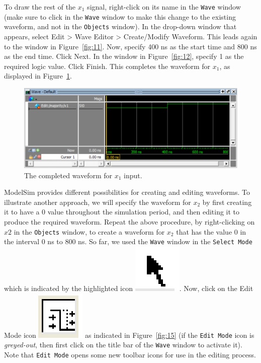 \documentclass[11pt, twoside, pdftex]{article}
\begin{document}
To draw the rest of the $x_1$ signal, right-click on its name in the \texttt{Wave} window (make
sure to click in the \texttt{Wave} window to make this 
change to the existing waveform, and not in the \texttt{Objects} window).
In the drop-down window that appears, select {\sf Edit > Wave Editor > Create/Modify Waveform}.
This leads again to the window in Figure~\ref{fig:11}. Now, specify 400 ns as the start time
and 800 ns as the end time. Click {\sf Next}. In the window in Figure~\ref{fig:12}, specify
1 as the required logic value. Click {\sf Finish}. This completes the waveform for $x_1$,
as displayed in Figure~\ref{fig:14}.


\begin{figure}[H]
   \begin{center}
      \includegraphics[scale=1.0]{figures/figure14.png}
   \caption{The completed waveform for $x_1$ input.} 
	 \label{fig:14}
	 \end{center}
\end{figure}

ModelSim provides different possibilities for creating and editing waveforms. To illustrate another
approach, we will specify the waveform for $x_2$ by first creating it to have a 0 value
throughout the simulation period, and then editing it to produce the required waveform.
Repeat the above procedure, by right-clicking on $x2$ in the \texttt{Objects} window,
to create a waveform for $x_2$ that has the value 0 in the interval 0 ns to 800 ns. 
So far, we used the \texttt{Wave} window in the \texttt{Select Mode} which is indicated by the 
highlighted icon  \includegraphics[scale=1]{figures/icon2.png}. Now, click on the {\sf Edit Mode}
icon \includegraphics[scale=1]{figures/icon3.png} as indicated in Figure~\ref{fig:15} 
(if the \texttt{Edit Mode} icon is {\it greyed-out}, then first click on the title bar of the 
\texttt{Wave} window to activate it).  Note that \texttt{Edit Mode} opens some new toolbar 
icons for use in the editing process.
\end{document}
